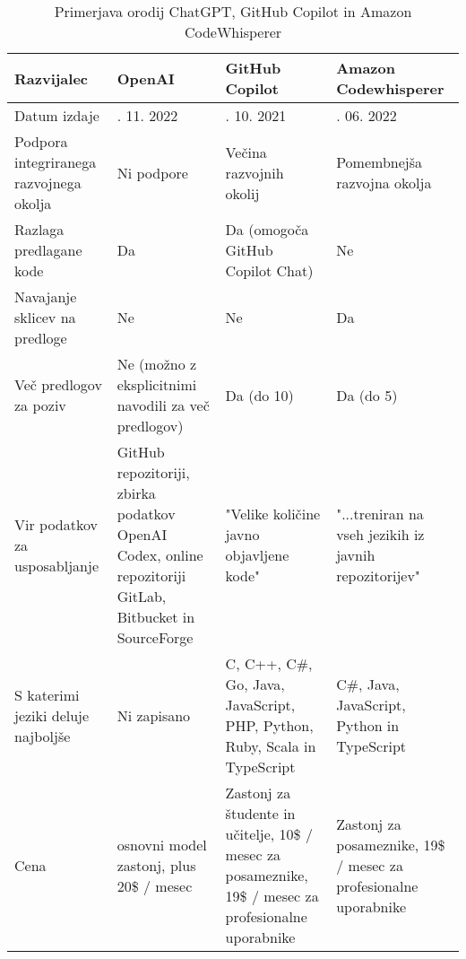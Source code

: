 \documentclass[a4paper,12pt,openright]{book}
\begin{document}
\begin{longtable}{|>{\raggedright\arraybackslash}p{2.5cm}|>{\raggedright\arraybackslash}p{3cm}|>{\raggedright\arraybackslash}p{3.5cm}|>{\raggedright\arraybackslash}p{3cm}|}
\caption{Primerjava orodij ChatGPT, GitHub Copilot in Amazon CodeWhisperer} \\
\hline
Razvijalec              & OpenAI      & GitHub Copilot                 & Amazon Codewhisperer            \\ \hline
Datum izdaje               & 30. 11. 2022        & 29. 10. 2021           & 23. 06. 2022       \\ \hline
Podpora integriranega razvojnega okolja           & Ni podpore          & Večina razvojnih okolij        & Pomembnejša razvojna okolja          \\ \hline
Razlaga predlagane kode       & Da                       & Da (omogoča GitHub Copilot Chat)                           & Ne                       \\ \hline
Navajanje sklicev na predloge                  & Ne                      & Ne                    & Da                      \\ \hline
Več predlogov za poziv                & Ne (možno z eksplicitnimi navodili za več predlogov)         & Da (do 10)                  & Da (do 5)               \\ \hline
Vir podatkov za usposabljanje             & GitHub repozitoriji, zbirka podatkov OpenAI Codex, online repozitoriji GitLab, Bitbucket in SourceForge                   & "Velike količine javno objavljene kode"                  & "...treniran na vseh jezikih iz javnih repozitorijev"                    \\ \hline
S katerimi jeziki deluje najboljše                        & Ni zapisano                  & C, C++, C\#, Go, Java, JavaScript, PHP, Python, Ruby, Scala in TypeScript              & C\#, Java, JavaScript, Python in TypeScript  \\ \hline
Cena               & osnovni model zastonj, plus 20\$ / mesec          & Zastonj za študente in učitelje, 10\$ / mesec za posameznike, 19\$ / mesec za profesionalne uporabnike                    &   Zastonj za posameznike, 19\$ / mesec za profesionalne uporabnike            \\ \hline
\end{longtable}
\label{tab:comparison}
\end{document}
